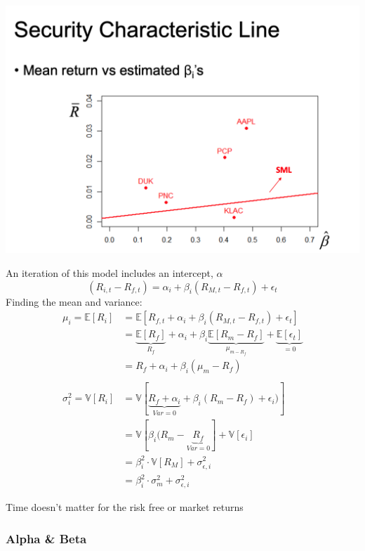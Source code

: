 \documentclass[
  oneside]{book}
\begin{document}
\includegraphics{Notes/Obsidian-Attachments/4-Factor-Models-1.png}

An iteration of this model includes an intercept, \(\alpha\)
\[
(R_{i,t} - R_{f,t}) = \alpha_{i} + \beta_{i}(R_{M,t}-R_{f,t})+\epsilon_{t}
\]
Finding the mean and variance:
\[
\begin{aligned}
\mu_{i} = \mathbb{E}[R_{i}] &= \mathbb{E}[R_{f,t}+\alpha_{i}+\beta_{i}(R_{M,t}-R_{f,t})+\epsilon_{t}]\\
&= \underbrace{ \mathbb{E}[R_{f}] }_{ R_{f} } + \alpha_{i} + \beta_{i}\underbrace{ \mathbb{E}[R_{m}-R_{f}] }_{ \mu_{m - R_{f}} } + \underbrace{ \mathbb{E}[\epsilon_{t}] }_{ =0 }\\
&= R_{f} + \alpha_{i} + \beta_{i}(\mu_{m}-R_{f})\\
\\
\sigma^{2}_{i} = \mathbb{V}[R_{i}] &= \mathbb{V}[\underbrace{ R_{f}+\alpha_{i} }_{ Var = 0 }+\beta_{i}(R_{m}-R_{f})+\epsilon_{i})]\\
&= \mathbb{V}[\beta_{i}(R_{m}-\underbrace{ R_{f} }_{ Var = 0 }] + \mathbb{V}[\epsilon_{i}]\\
&= \beta_{i}^{2} \cdot \mathbb{V}[R_{M}] + \sigma^{2}_{\epsilon, i}\\
&= \beta^{2}_{i}\cdot \sigma^{2}_{m}+\sigma^{2}_{\epsilon,i}
\end{aligned}
\]

Time doesn't matter for the risk free or market returns

\hypertarget{alpha-beta}{%
\subsubsection{Alpha \& Beta}\label{alpha-beta}}
\end{document}
